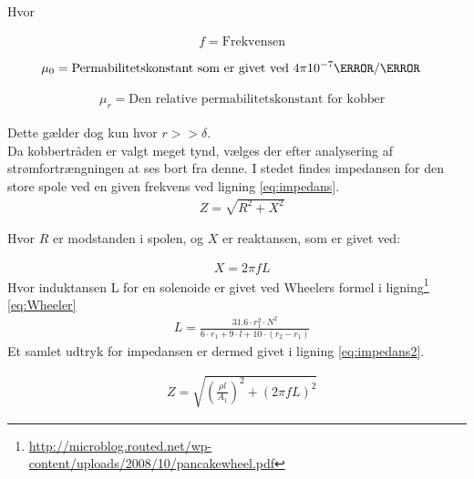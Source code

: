 Hvor 



\begin{align}
	& f = \text{Frekvensen} \nonumber
\end{align}

\begin{align}
	& \mu_0 = \text{Permabilitetskonstant som er givet ved $4\pi 10^{-7}\henry/\meter$} \nonumber
\end{align}

\begin{align}
	& \mu_r = \text{Den relative permabilitetskonstant for kobber} \nonumber
\end{align}


Dette gælder dog kun hvor $r>>\delta$. \\
Da kobbertråden er valgt meget tynd, vælges der efter analysering af strømfortrængningen at ses bort fra denne. 
I stedet findes impedansen for den store spole ved en given frekvens ved ligning \ref{eq:impedans}.
\begin{align}
	& Z=\sqrt{R^2+X^2} \label{eq:impedans}
\end{align}

Hvor $R$ er modstanden i spolen, og $X$ er reaktansen, som er givet ved:

\begin{align}
	& X=2\pi f L \nonumber
\end{align}
Hvor induktansen L for en solenoide er givet ved Wheelers formel i ligning\footnote{\url{http://microblog.routed.net/wp-content/uploads/2008/10/pancakewheel.pdf}} \ref{eq:Wheeler}
\begin{align}
	& L =\frac{31.6\cdot r_1^2\cdot N^2}{6\cdot r_1+9\cdot l + 10\cdot (r_2-r_1)}  \label{eq:Wheeler}
\end{align}
Et samlet udtryk for impedansen er dermed givet i ligning \ref{eq:impedans2}.

\begin{align}
	& Z=\sqrt{\left(\frac{\rho l}{A_1}\right)^2+\left(2\pi f L\right)^2} \label{eq:impedans2}
\end{align}


